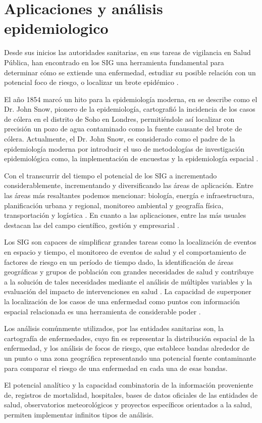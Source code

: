 \section{Aplicaciones y análisis epidemiologico}
\label{sec:cap2-aplicaciones-analisis-epidemiologico}
Desde sus inicios las autoridades sanitarias, en sus tareas de vigilancia en Salud Pública, han
encontrado en los SIG una herramienta fundamental para determinar cómo se extiende una enfermedad,
estudiar su posible relación con un potencial foco de riesgo, o localizar un brote epidémico
\citep{vgomesAegis2001}.

El año 1854 marcó un hito para la epidemiología moderna, en \citet{jCerdaJohnSnow2007} se describe
como el Dr. John Snow, pionero de la epidemiología, cartografió la incidencia de los casos de
cólera en el distrito de Soho en Londres, permitiéndole así localizar con precisión un pozo de
agua contaminado como la fuente causante del brote de cólera. Actualmente, el Dr. John Snow, es
considerado como el padre de la epidemiología moderna por introducir el uso de  metodologías de
investigación epidemiológica como, la implementación de encuestas y la epidemiología espacial
\citep{jCerdaJohnSnow2007}.

Con el transcurrir del tiempo el potencial de los SIG a incrementado considerablemente,  incrementando y diversificando las áreas de aplicación. Entre las áreas más resaltantes podemos
mencionar: biología, energía e infraestructura, planificación urbana y regional, monitoreo
ambiental y geografía física, transportación y logística \citep{fAlonsoSig2006}. En cuanto a las
aplicaciones, entre las más usuales destacan las del campo científico, gestión y empresarial
\citep{fAlonsoSig2006}.

Los SIG son capaces de simplificar grandes tareas como la localización de eventos en espacio y
tiempo, el monitoreo de eventos de salud y el comportamiento de factores de riesgo en un período
de tiempo dado, la identificación de áreas geográficas y grupos de población con grandes
necesidades de salud y contribuye a la solución de tales necesidades mediante el análisis de
múltiples variables y la evaluación del impacto de intervenciones en salud
\cite{iMolinaSigEpidemiologia}. La capacidad de superponer la localización de los casos de una
enfermedad como puntos con información espacial relacionada es una herramienta de considerable
poder \cite{iMolinaSigEpidemiologia}.

Los análisis comúnmente utilizados, por las entidades sanitarias son, la cartografía de
enfermedades, cuyo fin es representar la distribución espacial de la enfermedad, y los análisis de
focos de riesgo, que establece bandas alrededor de un punto o una  zona geográfica representando
una potencial  fuente contaminante para comparar el riesgo de una enfermedad en cada una de esas
bandas.

El potencial analítico y la capacidad combinatoria de la información proveniente de, registros
de mortalidad, hospitales, bases de datos oficiales de las entidades de salud, observatorios
meteorológicos y proyectos específicos orientados a la salud, permiten implementar infinitos tipos
de análisis.
